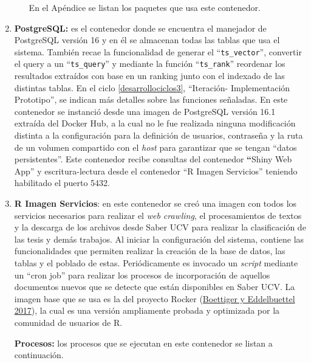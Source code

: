 \documentclass[
  12pt,
  openany]{book}
\begin{document}
\begin{enumerate}
\begin{enumerate}
    En el Apéndice se listan los paquetes que usa este contenedor.
  \end{enumerate}
\item
  \textbf{PostgreSQL:} es el contenedor donde se encuentra el manejador de PostgreSQL versión 16 y en él se almacenan todas las tablas que usa el sistema. También recae la funcionalidad de generar el ``\texttt{ts\_vector}'', convertir el query a un ``\texttt{ts\_query}'' y mediante la función ``\texttt{ts\_rank}'' reordenar los resultados extraídos con base en un ranking junto con el indexado de las distintas tablas. En el ciclo \ref{desarrollociclos3}, ``Iteración- Implementación Prototipo'', se indican más detalles sobre las funciones señaladas. En este contenedor se instanció desde una imagen de PostgreSQL versión 16.1 extraída del Docker Hub, a la cual no le fue realizada ninguna modificación distinta a la configuración para la definición de usuarios, contraseña y la ruta de un volumen compartido con el \emph{host} para garantizar que se tengan ``datos persistentes''. Este contenedor recibe consultas del contenedor \textbf{``}Shiny Web App'' y escritura-lectura desde el contenedor ``R Imagen Servicios'' teniendo habilitado el puerto 5432.
\item
  \textbf{R Imagen Servicios}: en este contenedor se creó una imagen con todos los servicios necesarios para realizar el \emph{web crawling}, el procesamientos de textos y la descarga de los archivos desde Saber UCV para realizar la clasificación de las tesis y demás trabajos. Al iniciar la configuración del sistema, contiene las funcionalidades que permiten realizar la creación de la base de datos, las tablas y el poblado de estas. Periódicamente es invocado un \emph{script} mediante un ``cron job'' para realizar los procesos de incorporación de aquellos documentos nuevos que se detecte que están disponibles en Saber UCV. La imagen base que se usa es la del proyecto Rocker (\protect\hyperlink{ref-RJ-2017-065:2017}{Boettiger y Eddelbuettel 2017}), la cual es una versión ampliamente probada y optimizada por la comunidad de usuarios de R.

  \textbf{Procesos:} los procesos que se ejecutan en este contenedor se listan a continuación.


\end{enumerate}
\end{document}
